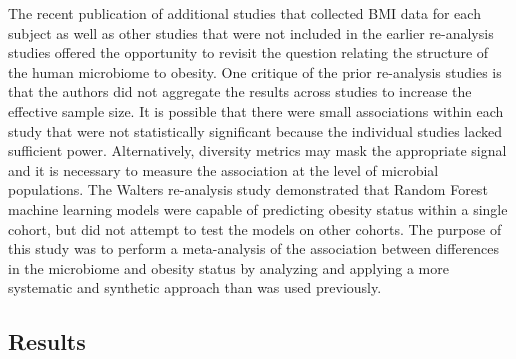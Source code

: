 \documentclass[12pt,]{article}
\begin{document}
The recent publication of additional studies that collected BMI data for
each subject as well as other studies that were not included in the
earlier re-analysis studies offered the opportunity to revisit the
question relating the structure of the human microbiome to obesity. One
critique of the prior re-analysis studies is that the authors did not
aggregate the results across studies to increase the effective sample
size. It is possible that there were small associations within each
study that were not statistically significant because the individual
studies lacked sufficient power. Alternatively, diversity metrics may
mask the appropriate signal and it is necessary to measure the
association at the level of microbial populations. The Walters
re-analysis study demonstrated that Random Forest machine learning
models were capable of predicting obesity status within a single cohort,
but did not attempt to test the models on other cohorts. The purpose of
this study was to perform a meta-analysis of the association between
differences in the microbiome and obesity status by analyzing and
applying a more systematic and synthetic approach than was used
previously.

\subsection{Results}\label{results}
\end{document}
